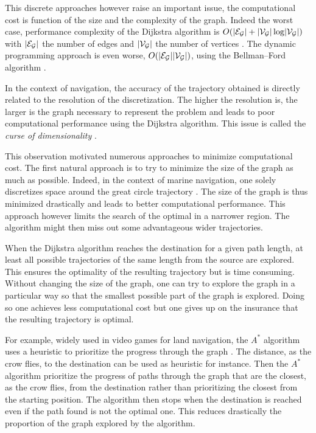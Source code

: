 This discrete approaches however raise an important issue, the computational cost is function of the size and the complexity of the graph.
Indeed the worst case, performance complexity of the Dijkstra algorithm is $O(\lvert\mathcal{E}_{\mathcal{G}}\rvert + \lvert\mathcal{V}_{\mathcal{G}}\rvert \log \lvert\mathcal{V}_{\mathcal{G}}\rvert)$ with $\lvert\mathcal{E}_{\mathcal{G}}\rvert$ the number of edges and $\lvert\mathcal{V}_{\mathcal{G}}\rvert$ the number of vertices \citep{fredman1987fibonacci}.
The dynamic programming approach is even worse, $O(\lvert\mathcal{E}_{\mathcal{G}}\rvert \lvert\mathcal{V}_{\mathcal{G}}\rvert)$, using the Bellman–Ford algorithm \citep{ford1956network, bellman1958routing}.

In the context of navigation, the accuracy of the trajectory obtained is directly related to the resolution of the discretization.
The higher the resolution is, the larger is the graph necessary to represent the problem and leads to poor computational performance using the Dijkstra algorithm. 
This issue is called the \textit{curse of dimensionality} \citep{bellman1957dynamic}.

This observation motivated numerous approaches to minimize computational cost.
The first natural approach is to try to minimize the size of the graph as much as possible.
Indeed, in the context of marine navigation, one solely discretizes space around the great circle trajectory \citep{kobayashi2017advanced}.
The size of the graph is thus minimized drastically and leads to better computational performance.
This approach however limits the search of the optimal in a narrower region.
The algorithm might then miss out some advantageous wider trajectories.

When the Dijkstra algorithm reaches the destination for a given path length, at least all possible trajectories of the same length from the source are explored.
This ensures the optimality of the resulting trajectory but is time consuming.
Without changing the size of the graph, one can try to explore the graph in a particular way so that the smallest possible part of the graph is explored.
Doing so one achieves less computational cost but one gives up on the insurance that the resulting trajectory is optimal.

For example, widely used in video games for land navigation, the $A^*$ algorithm uses a heuristic to prioritize the progress through the graph \citep{hart1968formal}.
The distance, as the crow flies, to the destination can be used as heuristic for instance.
Then the $A^*$ algorithm prioritize the progress of paths through the graph that are the closest, as the crow flies, from the destination rather than prioritizing the closest from the starting position.
The algorithm then stops when the destination is reached even if the path found is not the optimal one.
This reduces drastically the proportion of the graph explored by the algorithm.

